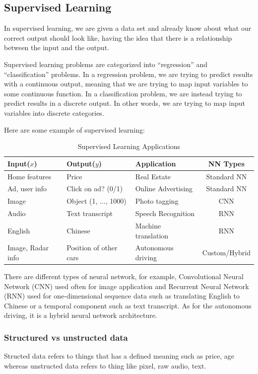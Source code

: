 \documentclass[UTF8]{article}
\begin{document}
\subsection{Supervised Learning}
In supervised learning, we are given a data set and already know about what our correct output
should look like, having the idea that there is a relationship between the input and the output.

Supervised learning problems are categorized into ``regression'' and ``classification'' problems.
In a regression problem, we are trying to predict results with a continuous output, meaning that we
are trying to map input variables to some continuous function. In a classification problem, we are
instead trying to predict results in a discrete output. In other words, we are trying to map input
variables into discrete categories.

Here are some example of supervised learning:
\begin{table}[ht]
\centering
\caption{Supervised Learning Applications}
\begin{tabular}{lllc}
\textbf{Input($x$)} & \textbf{Output($y$)} & \textbf{Application}
& \textbf{NN Types} \\ \hline
Home features & Price & Real Estate & Standard NN \\
Ad, user info & Click on ad? (0/1) & Online Advertising & Standard NN \\
Image & Object (1, ..., 1000) & Photo tagging & CNN \\
Audio & Text transcript & Speech Recognition & RNN \\
English & Chinese & Machine translation & RNN \\
Image, Radar info & Position of other cars & Autonomous driving & Custom/Hybrid \\
\end{tabular}
\end{table}

There are different types of neural network, for example, Convolutional Neural Network (CNN) used
often for image application and Recurrent Neural Network (RNN) used for one-dimensional sequence
data such as translating English to Chinese or a temporal component such as text transcript. As for
the autonomous driving, it is a hybrid neural network architecture.

\subsubsection{Structured vs unstructed data}
Structed data refers to things that has a defined meaning such as price, age whereas unstructed
data refers to thing like pixel, raw audio, text.
\end{document}
